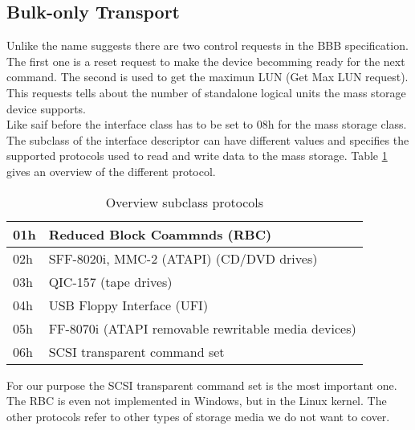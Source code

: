 \subsection{Bulk-only Transport}

Unlike the name suggests there are two control requests in the BBB specification. The first one is a reset request to make the device becomming ready for the next command. The second is used to get the maximun LUN (Get Max LUN request). This requests tells about the number of standalone logical units the mass storage device supports.\\
Like saif before the interface class has to be set to 08h for the mass storage class. The subclass of the interface descriptor can have different values and specifies the supported protocols used to read and write data to the mass storage. Table \ref{table:subclass} gives an overview of the different protocol.

\begin{table}[ht]
\caption{Overview subclass protocols}
\centering
\begin{tabular}{|l|l|}
\hline\hline
01h & Reduced Block Coammnds (RBC) \\ \hline
02h & SFF-8020i, MMC-2 (ATAPI) (CD/DVD drives) \\ \hline
03h & QIC-157 (tape drives) \\ \hline
04h & USB Floppy Interface (UFI) \\ \hline
05h & FF-8070i (ATAPI removable rewritable media devices) \\ \hline
06h & SCSI transparent command set \\ \hline
\end{tabular}
\label{table:subclass}
\end{table}

For our purpose the SCSI transparent command set is the most important one. The RBC is even not implemented in Windows, but in the Linux kernel. The other protocols refer to other types of storage media we do not want to cover.